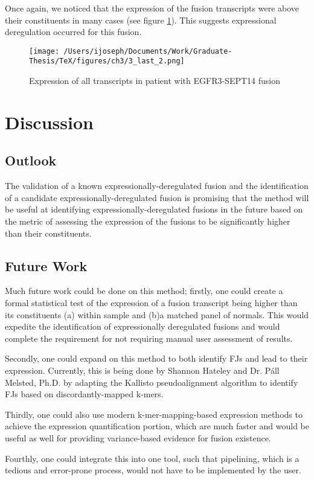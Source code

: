 Once again, we noticed that the expression of the fusion transcripts were above their constituents in many cases (see figure \ref{threefive}). This suggests expressional
deregulation occurred for this fusion.


\begin{figure}
  \centering \texttt{[image: /Users/ijoseph/Documents/Work/Graduate-Thesis/TeX/figures/ch3/3\_last\_2.png]}
  \caption{Expression of all transcripts in patient with EGFR3-SEPT14
    fusion} \label{threefive}
\end{figure}

\section{Discussion}

\subsection{Outlook}
The validation of a known expressionally-deregulated fusion and the identification of a candidate expressionally-deregulated fusion is promising that the method will be useful at identifying expressionally-deregulated fusions in the future based on the metric of assessing the expression of the fusions to be significantly higher than their constituents.

\subsection{Future Work}
  
Much future work could be done on this method; firstly, one could create a formal statistical test of the expression of a fusion transcript being higher than its constituents (a) within sample and (b)a matched panel of normals. This would expedite the identification of expressionally deregulated fusions and would complete the requirement for not requiring manual user assessment of results.

Secondly, one could expand on this method to both identify FJs and lead to their expression. Currently, this is being done by Shannon Hateley and Dr. P\'{a}ll Melsted, Ph.D. by adapting the Kallisto pseudoalignment algorithm\cite{bray_near-optimal_2016} to identify FJs based on discordantly-mapped k-mers.

Thirdly, one could also use modern k-mer-mapping-based expression methods to achieve the expression quantification portion, which are much faster and would be useful as well for providing variance-based evidence for fusion existence.

Fourthly, one could integrate this into one tool, such that pipelining, which is a tedious and error-prone process, would not have to be implemented by the user.









